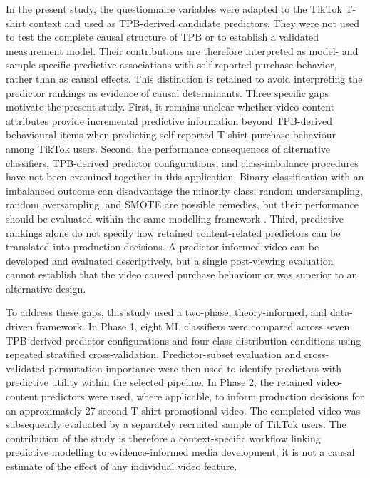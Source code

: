 \documentclass[jtaer,article,submit,moreauthors]{Definitions/mdpi}
\begin{document}
In the present study, the questionnaire variables were adapted to the TikTok
T-shirt context and used as TPB-derived candidate predictors. They were not
used to test the complete causal structure of TPB or to establish a validated
measurement model. Their contributions are therefore interpreted as
model- and sample-specific predictive associations with self-reported
purchase behavior, rather than as causal effects. This distinction is retained to
avoid interpreting the predictor rankings as evidence of causal determinants.
Three specific gaps motivate the present study. First, it remains unclear
whether video-content attributes provide incremental predictive information
beyond TPB-derived behavioural items when predicting self-reported T-shirt
purchase behaviour among TikTok users. Second, the performance consequences
of alternative classifiers, TPB-derived predictor configurations, and
class-imbalance procedures have not been examined together in this
application. Binary classification with an imbalanced outcome can
disadvantage the minority class; random undersampling, random oversampling,
and SMOTE are possible remedies, but their performance should be evaluated
within the same modelling framework \cite{Chawla2002}. Third, predictive
rankings alone do not specify how retained content-related predictors can be
translated into production decisions. A predictor-informed video can be
developed and evaluated descriptively, but a single post-viewing evaluation
cannot establish that the video caused purchase behaviour or was superior to
an alternative design.

To address these gaps, this study used a two-phase, theory-informed, and
data-driven framework. In Phase 1, eight ML classifiers were compared across
seven TPB-derived predictor configurations and four class-distribution
conditions using repeated stratified cross-validation. Predictor-subset
evaluation and cross-validated permutation importance were then used to
identify predictors with predictive utility within the selected pipeline. In
Phase 2, the retained video-content predictors were used, where applicable,
to inform production decisions for an approximately 27-second T-shirt
promotional video. The completed video was subsequently evaluated by a
separately recruited sample of TikTok users. The contribution of the study
is therefore a context-specific workflow linking predictive modelling to
evidence-informed media development; it is not a causal estimate of the
effect of any individual video feature.
\end{document}
